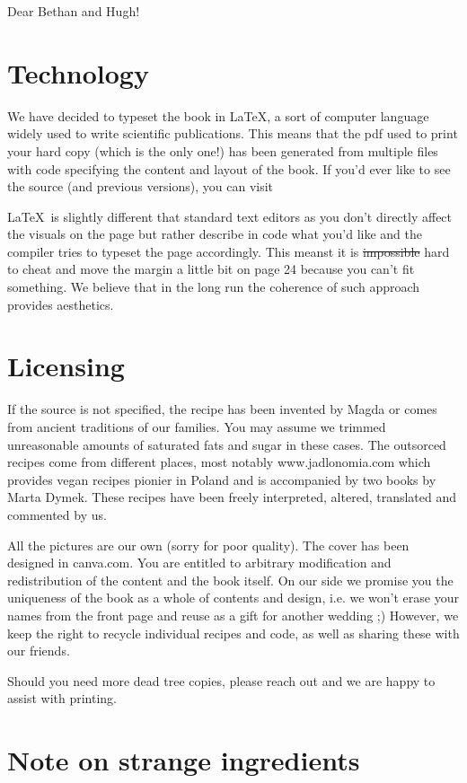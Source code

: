 
Dear Bethan and Hugh!


\section*{Technology}
We have decided to typeset the book in \LaTeX,
a sort of computer language widely used to write scientific publications.
This means that the pdf used to print your hard copy (which is the only one!)
has been generated from multiple files with code specifying the content and layout
of the book.
If you'd ever like to see the source (and previous versions),
you can visit 

\LaTeX~is slightly different that standard text editors as you don't directly affect the visuals
on the page but rather describe in code what you'd like and the compiler tries to
typeset the page accordingly.
This meanst it is \sout{impossible} hard to cheat and
move the margin a little bit on page 24 because you can't fit something.
We believe that in the long run the coherence of such approach provides aesthetics.

\section*{Licensing}
If the source is not specified, the recipe has been invented by Magda or comes from
ancient traditions of our families.
You may assume we trimmed unreasonable amounts of saturated fats and sugar in these cases.
The outsorced recipes come from different places, most notably www.jadlonomia.com which
provides vegan recipes pionier in Poland and is accompanied by two books by Marta Dymek.
These recipes have been freely interpreted, altered, translated and commented by us.

All the pictures are our own (sorry for poor quality).
The cover has been designed in canva.com.
You are entitled to arbitrary modification and redistribution of the content and the book itself.
On our side we promise you the uniqueness of the book as a whole of contents and design,
i.e. we won't erase your names from the front page and reuse as a gift for another wedding ;)
However, we keep the right to recycle individual recipes and code,
as well as sharing these with our friends.

Should you need more dead tree copies, please reach out and we are happy to assist with printing.

\section*{Note on strange ingredients}


